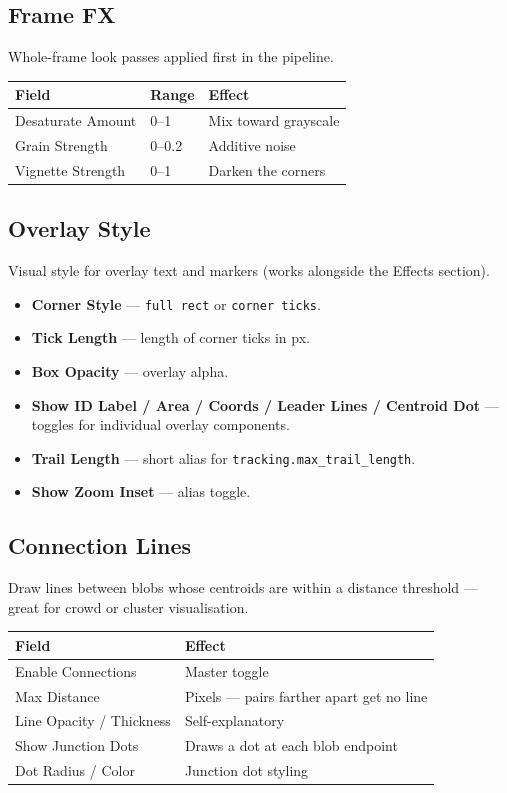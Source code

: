 \documentclass[11pt,a4paper,openany]{report}
\begin{document}
\subsection{Frame FX}
Whole-frame look passes applied first in the pipeline.

\begin{tabularx}{\linewidth}{@{}llX@{}}
    \toprule
    \textbf{Field} & \textbf{Range} & \textbf{Effect} \\
    \midrule
    Desaturate Amount & 0--1   & Mix toward grayscale \\
    Grain Strength    & 0--0.2 & Additive noise \\
    Vignette Strength & 0--1   & Darken the corners \\
    \bottomrule
\end{tabularx}

\subsection{Overlay Style}
Visual style for overlay text and markers (works alongside the Effects
section).

\begin{itemize}
    \item \textbf{Corner Style} --- \texttt{full rect} or \texttt{corner ticks}.
    \item \textbf{Tick Length} --- length of corner ticks in px.
    \item \textbf{Box Opacity} --- overlay alpha.
    \item \textbf{Show ID Label / Area / Coords / Leader Lines / Centroid Dot}
        --- toggles for individual overlay components.
    \item \textbf{Trail Length} --- short alias for
        \texttt{tracking.max\_trail\_length}.
    \item \textbf{Show Zoom Inset} --- alias toggle.
\end{itemize}

\subsection{Connection Lines}
Draw lines between blobs whose centroids are within a distance threshold ---
great for crowd or cluster visualisation.

\begin{tabularx}{\linewidth}{@{}lX@{}}
    \toprule
    \textbf{Field} & \textbf{Effect} \\
    \midrule
    Enable Connections   & Master toggle \\
    Max Distance         & Pixels --- pairs farther apart get no line \\
    Line Opacity / Thickness & Self-explanatory \\
    Show Junction Dots   & Draws a dot at each blob endpoint \\
    Dot Radius / Color   & Junction dot styling \\
    \bottomrule
\end{tabularx}
\end{document}
